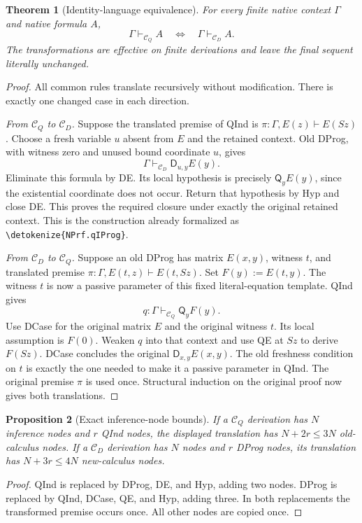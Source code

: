 \documentclass[11pt,letterpaper]{article}
\newtheorem{theorem}{Theorem}[section]
\newtheorem{proposition}[theorem]{Proposition}
\theoremstyle{definition}\newtheorem{definition}[theorem]{Definition}
\theoremstyle{remark}\newtheorem{remark}[theorem]{Remark}
\newcommand{\CD}{\mathcal C_D}
\newcommand{\CQ}{\mathcal C_Q}
\newcommand{\D}{\mathsf D}
\newcommand{\Q}{\mathsf Q}
\newcommand{\file}[1]{\expandafter\nolinkurl\expandafter{\detokenize{#1}}}
\begin{document}
\begin{theorem}[Identity-language equivalence]
\label{thm:equivalence}
For every finite native context $\Gamma$ and native formula $A$,
\[
                 \Gamma\vdash_{\CQ}A
                 \quad\Longleftrightarrow\quad
                 \Gamma\vdash_{\CD}A.
\]
The transformations are effective on finite derivations and leave the
final sequent literally unchanged.
\end{theorem}
\begin{proof}
All common rules translate recursively without modification. There is
exactly one changed case in each direction.

\emph{From $\CQ$ to $\CD$.}
Suppose the translated premise of QInd is
$\pi:\Gamma,E(z)\vdash E(Sz)$. Choose a fresh variable $u$ absent
from $E$ and the retained context. Old DProg, with witness zero and
unused bound coordinate $u$, gives
\[
                   \Gamma\vdash_{\CD}\D_{u,y}E(y).
\]
Eliminate this formula by DE. Its local hypothesis is precisely
$\Q_yE(y)$, since the existential coordinate does not occur. Return
that hypothesis by Hyp and close DE. This proves the required closure
under exactly the original retained context. This is the construction
already formalized as \file{NPrf.qIProg}.

\emph{From $\CD$ to $\CQ$.}
Suppose an old DProg has matrix $E(x,y)$, witness $t$, and translated
premise $\pi:\Gamma,E(t,z)\vdash E(t,Sz)$. Set $F(y):=E(t,y)$.
The witness $t$ is now a passive parameter of this fixed literal-equation
template. QInd gives
\[
                      q:\Gamma\vdash_{\CQ}\Q_yF(y).
\]
Use DCase for the original matrix $E$ and the original witness $t$.
Its local assumption is $F(0)$. Weaken $q$ into that context and use
QE at $Sz$ to derive $F(Sz)$. DCase concludes the original
$\D_{x,y}E(x,y)$. The old freshness condition on $t$ is exactly the
one needed to make it a passive parameter in QInd. The original premise
$\pi$ is used once. Structural induction on the original proof now gives
both translations.
\end{proof}

\begin{proposition}[Exact inference-node bounds]
If a $\CQ$ derivation has $N$ inference nodes and $r$ QInd nodes,
the displayed translation has $N+2r\leq3N$ old-calculus nodes.
If a $\CD$ derivation has $N$ nodes and $r$ DProg nodes, its
translation has $N+3r\leq4N$ new-calculus nodes.
\end{proposition}
\begin{proof}
QInd is replaced by DProg, DE, and Hyp, adding two nodes. DProg is
replaced by QInd, DCase, QE, and Hyp, adding three. In both replacements
the transformed premise occurs once. All other nodes are copied once.
\end{proof}
\end{document}
